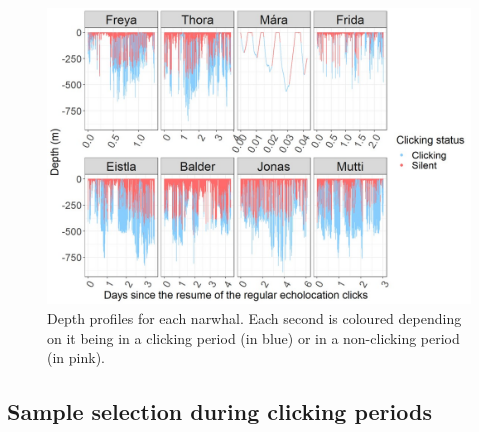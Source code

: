 \documentclass[preprint]{JASA}
\begin{document}
\begin{figure}[t]
\includegraphics[width=6in]{Figure2}%
\caption{\label{fig:FIG2}{Depth profiles for each narwhal. Each second is coloured depending on it being in a clicking period (in blue) or in a non-clicking period (in pink).
}}


\raggedright

\end{figure}

\subsection{\label{sec:2:5} Sample selection during clicking periods}

\end{document}
